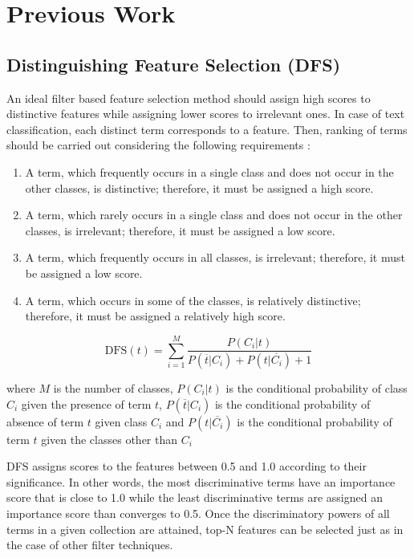 \documentclass[a4paper, 14pt]{article}
\begin{document}
\clearpage
\section{Previous Work}
\begin{justify}


\subsection{Distinguishing Feature Selection (DFS)}
\begin{justify}
An ideal filter based feature selection method \cite{dfs} should assign high scores to distinctive features while assigning lower scores to irrelevant ones. In case of text classification, each distinct term corresponds to a feature. Then, ranking of terms should be carried out considering the following requirements :

\begin{enumerate}
  \item A term, which frequently occurs in a single class and does not occur in the other classes, is distinctive; therefore, it must be assigned a high score.
  \item A term, which rarely occurs in a single class and does not occur in the other classes, is irrelevant; therefore, it must be assigned a low score.
  \item A term, which frequently occurs in all classes, is irrelevant; therefore, it must be assigned a low score.
  \item A term, which occurs in some of the classes, is relatively distinctive; therefore, it must be assigned a relatively high score.
\end{enumerate}

\[
\text{DFS}(t) = \sum_{i=1}^{M}{\dfrac{P(C_{i}|t)}{P{(\overline{t}|C_{i})} + 
P{(t|\overline{C_{i}})} + 1
}}
\]

\justify
where $M$ is the number of classes, ${P(C_{i}|t)}$ is the conditional probability of class ${C_i}$ given the presence of term $t$, ${P(\overline{t}|C_{i})}$ is the conditional probability of absence of term $t$ given class ${C_i}$ and $P(t|\overline{C_{i}})$ is the conditional probability of term $t$ given the classes other than ${C_i}$

\justify
DFS assigns scores to the features between 0.5 and 1.0 according to their significance. In other words, the most discriminative terms have an importance score that is close to 1.0 while the least discriminative terms are assigned an importance score than converges to 0.5. Once the discriminatory powers of all terms in a given collection are attained, top-N features can be selected just as in the case of other filter techniques. 



\end{justify}
\end{justify}
\end{document}
